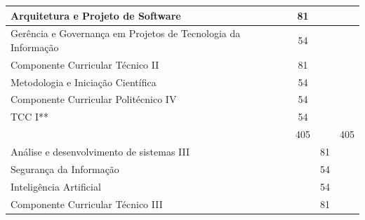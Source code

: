 \documentclass[11pt,fleqn]{book} %
\begin{document}
\begin{table}[]
{\begin{tabular}{@{}|l|c|c|c|c|c|c|@{}}
			Arquitetura e Projeto de Software                             &                      &                      &                      & 81                   &                      &             \\ \midrule
			Gerência e Governança em Projetos de Tecnologia da Informação &                      &                      &                      & 54                   &                      &             \\ \midrule
			Componente Curricular Técnico II                              &                      &                      &                      & 81                   &                      &             \\ \midrule
			Metodologia e Iniciação Científica                            &                      &                      &                      & 54                   &                      &             \\ \midrule
			Componente Curricular Politécnico IV                          &                      &                      &                      & 54                   &                      &             \\ \midrule
			TCC I**                                                       &                      &                      &                      & 54                   &                      &             \\ \midrule
			&                      &                      &                      & 405                  &                      & 405         \\ \midrule
			Análise e desenvolvimento de sistemas III                     &                      &                      &                      &                      & 81                   &             \\ \midrule
			Segurança da Informação                                       &                      &                      &                      &                      & 54                   &             \\ \midrule
			Inteligência Artificial                                       &                      &                      &                      &                      & 54                   &             \\ \midrule
			Componente Curricular Técnico III                             &                      &                      &                      &                      & 81                   &             \\ \midrule

\end{tabular}}
\end{table}
\end{document}

